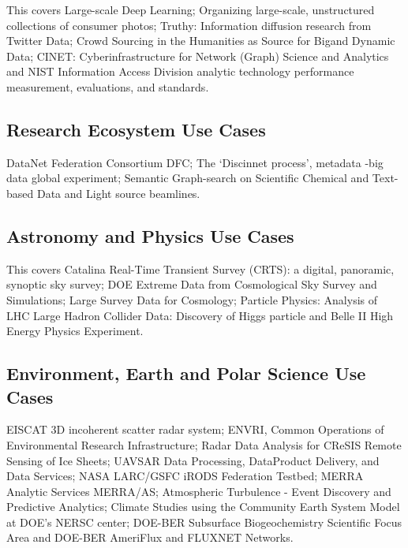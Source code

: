 This covers Large-scale Deep Learning; Organizing large-scale,
unstructured collections of consumer photos; Truthy: Information
diffusion research from Twitter Data; Crowd Sourcing in the Humanities
as Source for Bigand Dynamic Data; CINET: Cyberinfrastructure for
Network (Graph) Science and Analytics and NIST Information Access
Division analytic technology performance measurement, evaluations, and
standards.




\subsection{Research Ecosystem Use Cases}

DataNet Federation Consortium DFC; The `Discinnet process', metadata
-big data global experiment; Semantic Graph-search on Scientific
Chemical and Text-based Data and Light source beamlines.




\subsection{Astronomy and Physics Use Cases}

This covers Catalina Real-Time Transient Survey (CRTS): a digital,
panoramic, synoptic sky survey; DOE Extreme Data from Cosmological Sky
Survey and Simulations; Large Survey Data for Cosmology; Particle
Physics: Analysis of LHC Large Hadron Collider Data: Discovery of Higgs
particle and Belle II High Energy Physics Experiment.





\subsection{Environment, Earth and Polar Science Use Cases}

EISCAT 3D incoherent scatter radar system; ENVRI, Common Operations of
Environmental Research Infrastructure; Radar Data Analysis for CReSIS
Remote Sensing of Ice Sheets; UAVSAR Data Processing, DataProduct
Delivery, and Data Services; NASA LARC/GSFC iRODS Federation Testbed;
MERRA Analytic Services MERRA/AS; Atmospheric Turbulence - Event
Discovery and Predictive Analytics; Climate Studies using the Community
Earth System Model at DOE's NERSC center; DOE-BER Subsurface
Biogeochemistry Scientific Focus Area and DOE-BER AmeriFlux and FLUXNET
Networks.


